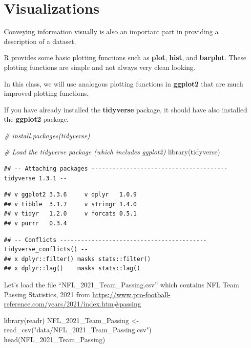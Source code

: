 \documentclass[
  11pt,
]{book}
\newenvironment{Shaded}{\begin{snugshade}}{\end{snugshade}}
\newcommand{\CommentTok}[1]{\textcolor[rgb]{0.56,0.35,0.01}{\textit{#1}}}
\newcommand{\FunctionTok}[1]{\textcolor[rgb]{0.00,0.00,0.00}{#1}}
\newcommand{\NormalTok}[1]{#1}
\newcommand{\OtherTok}[1]{\textcolor[rgb]{0.56,0.35,0.01}{#1}}
\newcommand{\StringTok}[1]{\textcolor[rgb]{0.31,0.60,0.02}{#1}}
\theoremstyle{definition}
\theoremstyle{definition}
\theoremstyle{definition}
\theoremstyle{definition}
\theoremstyle{remark}
\begin{document}
\newpage

\hypertarget{visualizations}{%
\section{Visualizations}\label{visualizations}}

Conveying information visually is also an important part in providing a description of a dataset.

R provides some basic plotting functions such as \textbf{plot}, \textbf{hist}, and \textbf{barplot}. These plotting functions are simple and not always very clean looking.

In this class, we will use analogous plotting functions in \textbf{ggplot2} that are much improved plotting functions.

If you have already installed the \textbf{tidyverse} package, it should have also installed the \textbf{ggplot2} package.

\begin{Shaded}
\begin{Highlighting}[]
\CommentTok{\# install.packages(\textquotesingle{}tidyverse\textquotesingle{})}

\CommentTok{\# Load the tidyverse package (which includes ggplot2)}
\FunctionTok{library}\NormalTok{(tidyverse)}
\end{Highlighting}
\end{Shaded}

\begin{verbatim}
## -- Attaching packages --------------------------------------- tidyverse 1.3.1 --
\end{verbatim}

\begin{verbatim}
## v ggplot2 3.3.6     v dplyr   1.0.9
## v tibble  3.1.7     v stringr 1.4.0
## v tidyr   1.2.0     v forcats 0.5.1
## v purrr   0.3.4
\end{verbatim}

\begin{verbatim}
## -- Conflicts ------------------------------------------ tidyverse_conflicts() --
## x dplyr::filter() masks stats::filter()
## x dplyr::lag()    masks stats::lag()
\end{verbatim}

Let's load the file ``NFL\_2021\_Team\_Passing.csv'' which contains NFL Team Passing Statistics, 2021 from \url{https://www.pro-football-reference.com/years/2021/index.htm\#passing}

\begin{Shaded}
\begin{Highlighting}[]
\FunctionTok{library}\NormalTok{(readr)}
\NormalTok{NFL\_2021\_Team\_Passing }\OtherTok{\textless{}{-}} \FunctionTok{read\_csv}\NormalTok{(}\StringTok{"data/NFL\_2021\_Team\_Passing.csv"}\NormalTok{)}
\FunctionTok{head}\NormalTok{(NFL\_2021\_Team\_Passing)}
\end{Highlighting}
\end{Shaded}
\end{document}
